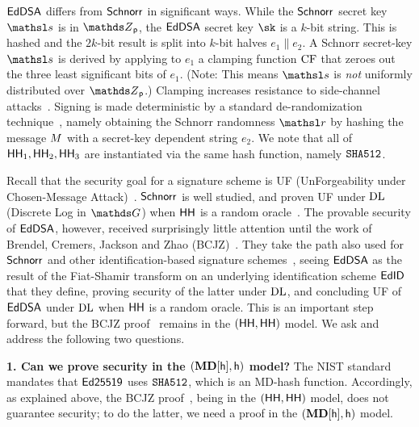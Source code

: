 $\mathsf{EdDSA}$ differs from $\mathsf{Schnorr}$ in significant ways. While the $\mathsf{Schnorr}$ secret key $\s$ is in $\Z_{\Prime}$, the $\mathsf{EdDSA}$ secret key $\sk$ is a $k$-bit string. This is hashed and the $2k$-bit result is split into $k$-bit halves $e_1\|e_2$. A Schnorr secret-key $\s$ is derived by applying to $e_1$ a clamping function $\mathrm{CF}$ that zeroes out the three least significant bits of $e_1$. (Note: This means $\s$ is \textit{not} uniformly distributed over $\Z_{\Prime}$.) Clamping increases resistance to side-channel attacks~\cite{bernstein2012high}. Signing is made deterministic by a standard de-randomization technique~\cite{C:Goldreich86a,SAC:MNPV98,AC:BelPoeSte16,EC:BelTac16}, namely obtaining the Schnorr randomness $\littler$ by hashing the message ${M}$ with a secret-key dependent string $e_2$. We note that all of $\mathsf{HH}_1,\mathsf{HH}_2,\mathsf{HH}_3$ are instantiated via the same hash function, namely $\texttt{SHA512}$.




 Recall that the security goal for a signature scheme is UF (UnForgeability under Chosen-Message Attack)~\cite{GolMicRiv88}. $\mathsf{Schnorr}$ is well studied, and proven UF under $\mathrm{DL}$ (Discrete Log in $\group$) when $\mathsf{HH}$ is a random oracle~\cite{JC:PoiSte00,EC:AABN02}. The provable security of $\mathsf{EdDSA}$, however, received surprisingly little attention until the work of Brendel, Cremers, Jackson and Zhao (BCJZ)~\cite{SP:BCJZ21}. They take the path also used for $\mathsf{Schnorr}$ and other identification-based signature schemes~\cite{JC:PoiSte00,EC:AABN02}, seeing $\mathsf{EdDSA}$ as the result of the Fiat-Shamir transform on an underlying identification scheme $\mathsf{EdID}$ that they define, proving security of the latter under $\mathrm{DL}$, and concluding UF of $\mathsf{EdDSA}$ under $\mathrm{DL}$ when $\mathsf{HH}$ is a random oracle. This is an important step forward, but the BCJZ proof~\cite{SP:BCJZ21} remains in the $(\mathsf{HH},\mathsf{HH})$ model. We ask and address the following two questions.


\medskip
\textbf{1. Can we prove security in the $(\mathbf{MD}[\mathsf{h}],\mathsf{h})$ model?} The NIST standard~\cite{NIST:EdDSA} mandates that $\mathsf{Ed25519}$ uses $\texttt{SHA512}$, which is an MD-hash function. Accordingly, as explained above, the BCJZ proof~\cite{SP:BCJZ21}, being in the $(\mathsf{HH},\mathsf{HH})$ model, does not guarantee security; to do the latter, we need a proof in the $(\mathbf{MD}[\mathsf{h}],\mathsf{h})$ model.

